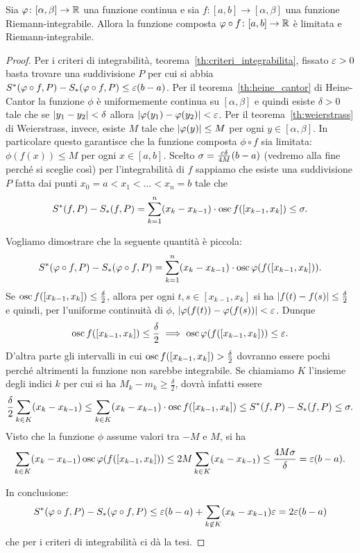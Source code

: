 \begin{theorem}
  \label{th:composta_integrabile}%
  Sia $\varphi\colon [\alpha,\beta]\to {\mathbb R}$ una funzione 
  continua e sia $f\colon [a,b]\to [\alpha,\beta]$ una 
  funzione Riemann-integrabile.
  Allora la funzione composta 
  $\varphi\circ f\colon[a,b]\to {\mathbb R}$ è 
  limitata e Riemann-integrabile.
\end{theorem}
%
\begin{proof}
Per i criteri di integrabilità, teorema~\ref{th:criteri_integrabilita},
fissato $\varepsilon>0$ basta trovare una suddivisione $P$
per cui si abbia $S^*(\varphi\circ f,P) - S_*(\varphi\circ f,P)\le \varepsilon(b-a)$.
Per il teorema~\ref{th:heine_cantor} di Heine-Cantor 
la funzione $\phi$ è uniformemente continua su $[\alpha,\beta]$ 
e quindi esiste $\delta>0$ tale che se ${\left|y_1-y_2\right|}< \delta$
allora ${\left|\varphi(y_1)-\varphi(y_2)\right|}< \varepsilon$. 
Per il teorema~\ref{th:weierstrass} di Weierstrass, invece, 
esiste $M$ tale che ${\left|\varphi(y)\right|}\le M$ per ogni $y\in [\alpha,\beta]$.
In particolare questo garantisce che la funzione composta $\phi \circ f$ 
sia limitata: $\phi(f(x))\le M$ per ogni $x\in [a,b]$.
Scelto $\sigma = \frac{\varepsilon \delta}{4M} (b-a)$ 
(vedremo alla fine perché si sceglie così)
per l'integrabilità di $f$ sappiamo che 
esiste una suddivisione $P$ fatta 
dai punti $x_0=a < x_1 < \dots < x_n=b$ tale che 
%
\[
  S^*(f,P) - S_*(f,P) 
  = \sum_{k=1}^n (x_k - x_{k-1})
  \cdot \operatorname{osc} f([x_{k-1},x_k])
  \le \sigma.
\]

Vogliamo dimostrare che la seguente quantità è piccola:
\[
 S^*(\varphi\circ f,P) - S_*(\varphi\circ f,P)
 = \sum_{k=1}^n (x_k - x_{k-1}) \cdot \operatorname{osc} \varphi(f([x_{k-1},x_k])).
\]
Se $\operatorname{osc} f([x_{k-1},x_k]) \le \frac{\delta }2$, 
allora per ogni $t,s\in[x_{k-1},x_k]$ si ha 
${\left|f(t)-f(s)\right|}\le \frac{\delta}{2}$
e quindi, per l'uniforme continuità di $\phi$,
${\left|\varphi(f(t))-\varphi(f(s))\right|}<\varepsilon$.
Dunque 
\[
  \operatorname{osc} f([x_{k-1},x_k]) \le \frac{\delta}{2} 
  \implies  
  \operatorname{osc} \varphi(f([x_{k-1},x_k]))\le \varepsilon.
\] 
D'altra parte gli intervalli in cui 
$\operatorname{osc} f([x_{k-1},x_k]) > \frac{\delta}{2}$ 
dovranno essere pochi perché altrimenti la funzione non sarebbe 
integrabile.
Se chiamiamo $K$ l'insieme degli indici $k$ per cui si 
ha $M_k-m_k\ge \frac \delta 2$, dovrà infatti essere 
\[
  \frac{\delta}{2}\sum_{k\in K} (x_k-x_{k-1})
  \le \sum_{k\in K} (x_k-x_{k-1})\cdot \operatorname{osc} f([x_{k-1},x_k])
  \le S^*(f,P) - S_*(f,P) \le \sigma.
\]
Visto che la funzione $\phi$ assume valori tra $-M$ e $M$, 
si ha  
\[
   \sum_{k\in K} (x_k-x_{k-1})
   \operatorname{osc} \varphi(f([x_{k-1},x_k]))
   \le 2M \sum_{k\in K} (x_k-x_{k-1})
   \le \frac{4M\sigma}{\delta} = \varepsilon (b-a).
\]

In conclusione: 
\begin{align*}
  S^*(\varphi\circ f,P)-S_*(\varphi\circ f,P)
  \le 
  \varepsilon (b-a) + 
  \sum_{k\not \in K} (x_k-x_{k-1}) \varepsilon
  = 2\varepsilon (b-a)
\end{align*}
che per i criteri di integrabilità ci dà la tesi.
\end{proof}

